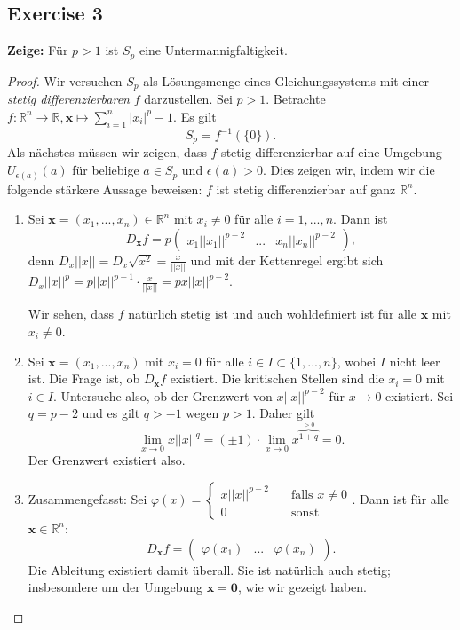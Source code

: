 \documentclass[a4paper, landscape,twocolumn,fontsize=9pt]{scrartcl}
\renewcommand{\hline}{\noindent\makebox[\linewidth]{\rule{12cm}{1pt}}}
\begin{document}
\subsection*{Exercise 3}

\textbf{Zeige:} Für $p > 1$ ist $S_p$ eine Untermannigfaltigkeit.
\begin{proof}
Wir versuchen $S_p$ als Lösungsmenge eines Gleichungssystems mit einer \textit{stetig differenzierbaren} $f$ darzustellen. Sei $p > 1$. Betrachte $f: \mathbb R^n \to \mathbb R, \mathbf x \mapsto \sum^n_{i = 1} |x_i|^p - 1$. Es gilt
\[
	S_p = f^{-1}{(\{0\})}.
\]
Als nächstes müssen wir zeigen, dass $f$ stetig differenzierbar auf eine Umgebung $U_{\epsilon(a)}(a)$ für beliebige $a \in S_p$ und $\epsilon(a) > 0$. Dies zeigen wir, indem wir die folgende stärkere Aussage beweisen: $f$ ist stetig differenzierbar auf ganz $\mathbb R^n$. 
\hline

\begin{enumerate}
\item Sei $\mathbf x = (x_1,...,x_n) \in \mathbb R^n$ mit $x_i \neq 0$ für alle $i = 1,...,n$. Dann ist
\[
	D_{\mathbf x}f = p \begin{pmatrix}
		x_1 ||x_1||^{p - 2} & ... & x_n ||x_n||^{p-2}
	\end{pmatrix},
\]
denn $D_x ||x|| = D_x \sqrt{x^2} = \frac{x}{||x||}$ und mit der Kettenregel ergibt sich $D_x||x||^p = p || x ||^{p-1} \cdot \frac{x}{||x||} = px||x||^{p-2}$. 

Wir sehen, dass $f$ natürlich stetig ist und auch wohldefiniert ist für alle $\mathbf x$ mit $x_i \neq 0$.

\item Sei $\mathbf x = (x_1,...,x_n)$ mit $x_i = 0$ für alle $i \in I \subset \{ 1,..., n \}$, wobei $I$ nicht leer ist. Die Frage ist, ob $D_\mathbf{x}f$ existiert. Die kritischen Stellen sind die $x_i = 0$ mit $i \in I$. Untersuche also, ob der Grenzwert von $x||x||^{p-2}$ für $x \to 0$ existiert. Sei $q = p-2$ und es gilt $q > -1$ wegen $p > 1$. Daher gilt
\[
	\lim_{x \to 0} x||x||^q = (\pm 1) \cdot \lim_{x \to 0}x^{\overbrace{1+q}^{>0}} = 0.
\]
Der Grenzwert existiert also.

\item Zusammengefasst: Sei $\varphi(x) = \begin{cases}
	x||x||^{p-2} \quad & \text{falls } x \neq 0 \\
	0 & \text{sonst}
\end{cases}$. Dann ist für alle $\mathbf x \in \mathbb R^n$:
\[
	D_\mathbf{x}f = \begin{pmatrix}
		\varphi(x_1) & ... & \varphi(x_n)
	\end{pmatrix}.
\]
Die Ableitung existiert damit überall. Sie ist natürlich auch stetig; insbesondere um der Umgebung $\mathbf x = \mathbf 0$, wie wir gezeigt haben.
\end{enumerate}


\end{proof}
\end{document}
